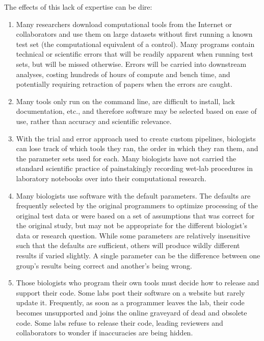 \documentclass[ChapterTOCs,krantz2]{krantz} %
\begin{document}
The effects of this lack of expertise can be dire:  
\begin{enumerate}
\item Many researchers download computational tools from the Internet 
or collaborators 
and use them on large datasets without first
running a known test set
(the computational equivalent of a control).  Many programs contain
technical or scientific errors that will be readily apparent when running 
test sets, but will be missed otherwise\cite{Kelly2008}. Errors will be
carried into downstream analyses, costing
hundreds of hours of compute and bench time, and 
potentially requiring retraction of papers when the errors are caught\cite{Merali2010}.  

\item Many tools only run on the command line, are difficult to install, lack
documentation, etc., and therefore software may be selected based on ease
of use, rather than accuracy and scientific relevance.

\item With the trial and error
approach used to create custom pipelines, biologists can
lose track of which tools they ran, the order in which they ran them, and the
parameter sets used for each.  Many biologists have not carried 
the standard scientific practice of painstakingly recording
wet-lab procedures in laboratory notebooks
over into their computational research.

\item Many biologists use software with the default parameters.  
The defaults are frequently selected by the original
programmers to optimize processing of the original test data or were based on a
set of assumptions that was correct for the original study, but may not be appropriate
for the different biologist's data or research question.  While some parameters 
are relatively insensitive such that the defaults are sufficient, others 
will produce wildly different results if varied slightly.  
A single parameter
can be the difference between one group's results being correct and another's
being wrong.  

\item Those biologists who program their own tools must decide how
to release and support their code.
Some labs post their software on a website but rarely update it.  
Frequently, as soon as a programmer
leaves the lab, their code becomes unsupported and 
joins the online graveyard of dead and obsolete code.  
Some labs refuse to release their code\cite{Morin2012}, 
leading reviewers and collaborators to wonder if 
inaccuracies are being hidden.  
\end{enumerate}
\end{document}
